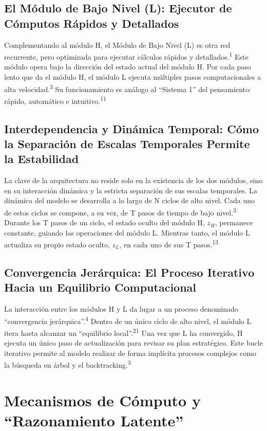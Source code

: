 \documentclass{article}
\begin{document}
	\subsection{El Módulo de Bajo Nivel (L): Ejecutor de Cómputos Rápidos y Detallados}
	Complementando al módulo H, el Módulo de Bajo Nivel (L) es otra red recurrente, pero optimizada para ejecutar cálculos rápidos y detallados.\textsuperscript{1} Este módulo opera bajo la dirección del estado actual del módulo H. Por cada paso lento que da el módulo H, el módulo L ejecuta múltiples pasos computacionales a alta velocidad.\textsuperscript{3} Su funcionamiento es análogo al ``Sistema 1'' del pensamiento: rápido, automático e intuitivo.\textsuperscript{11}
	
	\subsection{Interdependencia y Dinámica Temporal: Cómo la Separación de Escalas Temporales Permite la Estabilidad}
	La clave de la arquitectura no reside solo en la existencia de los dos módulos, sino en su interacción dinámica y la estricta separación de sus escalas temporales. La dinámica del modelo se desarrolla a lo largo de N ciclos de alto nivel. Cada uno de estos ciclos se compone, a su vez, de T pasos de tiempo de bajo nivel.\textsuperscript{3} Durante los T pasos de un ciclo, el estado oculto del módulo H, \(z_H\), permanece constante, guiando las operaciones del módulo L. Mientras tanto, el módulo L actualiza su propio estado oculto, \(z_L\), en cada uno de sus T pasos.\textsuperscript{13}
	
	\subsection{Convergencia Jerárquica: El Proceso Iterativo Hacia un Equilibrio Computacional}
	La interacción entre los módulos H y L da lugar a un proceso denominado ``convergencia jerárquica''.\textsuperscript{4} Dentro de un único ciclo de alto nivel, el módulo L itera hasta alcanzar un ``equilibrio local''.\textsuperscript{21} Una vez que L ha convergido, H ejecuta un único paso de actualización para revisar su plan estratégico. Este bucle iterativo permite al modelo realizar de forma implícita procesos complejos como la búsqueda en árbol y el backtracking.\textsuperscript{3}
	
	\section{Mecanismos de Cómputo y ``Razonamiento Latente''}
	
\end{document}
